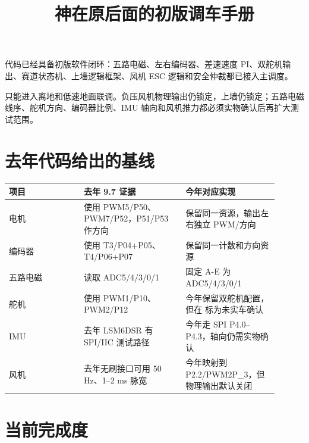 \documentclass[UTF8,zihao=-4]{ctexart}
\title{\bfseries 神在原后面的初版调车手册}
\begin{document}
\maketitle


代码已经具备初版软件闭环：五路电磁、左右编码器、差速速度 PI、双舵机输出、赛道状态机、上墙逻辑框架、风机 ESC 逻辑和安全仲裁都已接入主调度。

只能进入离地和低速地面联调。负压风机物理输出仍锁定，上墙仍锁定；五路电磁线序、舵机方向、编码器比例、IMU 轴向和风机推力都必须实物确认后再扩大测试范围。

\section*{去年代码给出的基线}

\begin{longtable}{L{0.25\linewidth}L{0.34\linewidth}L{0.31\linewidth}}
\toprule
项目 & 去年 9.7 证据 & 今年对应实现 \\
\midrule
电机 &  使用 PWM5/P50、PWM7/P52，P51/P53 作方向 &  保留同一资源，输出左右独立 PWM/方向 \\
编码器 &  使用 T3/P04+P05、T4/P06+P07 &  保留同一计数和方向资源 \\
五路电磁 &  读取 ADC5/4/3/0/1 &  固定 A-E 为 ADC5/4/3/0/1 \\
舵机 &  使用 PWM1/P10、PWM2/P12 & 今年保留双舵机配置，但在  标为未实车确认 \\
IMU & 去年 LSM6DSR 有 SPI/IIC 测试路径 & 今年走 SPI P4.0--P4.3，轴向仍需实物确认 \\
风机 & 去年无刷接口可用 50 Hz、1--2 ms 脉宽 & 今年映射到 P2.2/PWM2P\_3，但物理输出默认关闭 \\
\bottomrule
\end{longtable}

\section*{当前完成度}
\end{document}
